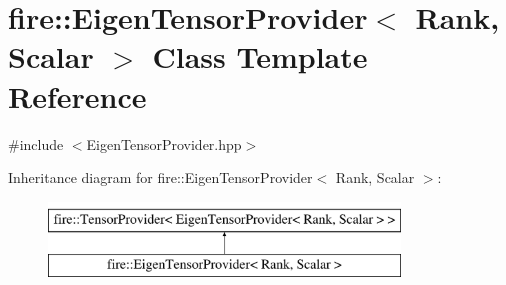 \hypertarget{a00014}{}\section{fire\+:\+:Eigen\+Tensor\+Provider$<$ Rank, Scalar $>$ Class Template Reference}
\label{a00014}


{\ttfamily \#include $<$Eigen\+Tensor\+Provider.\+hpp$>$}

Inheritance diagram for fire\+:\+:Eigen\+Tensor\+Provider$<$ Rank, Scalar $>$\+:\begin{figure}[H]
\begin{center}
\leavevmode
\includegraphics[height=2.000000cm]{a00014}
\end{center}
\end{figure}
